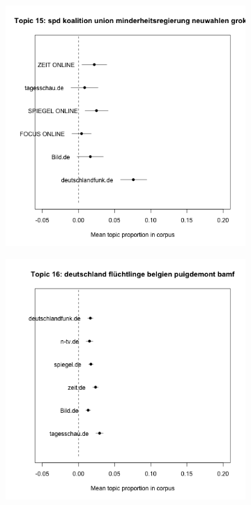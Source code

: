 \documentclass[12pt,a4paper,notitlepage]{article}
\begin{document}
\begin{figure}[H]
	\caption{Mean prevalence of topics within each news source corpus 2}
	\begin{center}
			\begin{subfigure}[normla]{0.2\textwidth}
			\includegraphics[width=\textwidth]{../figs/estimate_effect15.png}
		\end{subfigure}
		\begin{subfigure}[normla]{0.2\textwidth}
			\includegraphics[width=\textwidth]{../figs/estimate_effect16.png}

\end{subfigure}
\end{center}
\end{figure}
\end{document}
